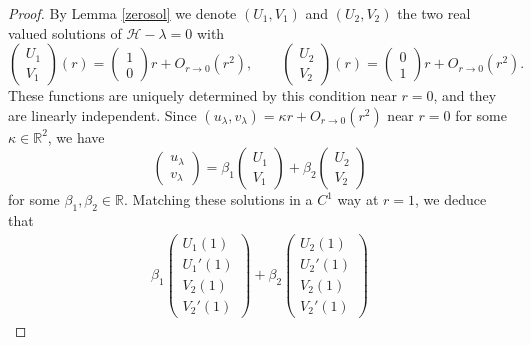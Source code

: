 \documentclass[11 pt]{amsart}
\theoremstyle{definition}
\theoremstyle{remark}
\numberwithin{equation}{section}
\begin{document}
\begin{proof}
By Lemma \ref{zerosol} we denote $(U_1, V_1)$ and $(U_2, V_2)$ the
  two real valued solutions of $\mathcal{H}- \lambda = 0$ with
  \[ \left(\begin{array}{c}
       U_1\\
       V_1
     \end{array}\right) (r) = \left(\begin{array}{c}
       1\\
       0
     \end{array}\right) r + O_{r \rightarrow 0} (r^2), \qquad \left(\begin{array}{c}
       U_2\\
       V_2
     \end{array}\right) (r) = \left(\begin{array}{c}
       0\\
       1
     \end{array}\right) r + O_{r \rightarrow 0} (r^2) . \]
  These functions are uniquely determined by this condition near $r = 0$, and
  they are linearly independent. Since $(u_{\lambda}, v_{\lambda}) = \kappa r
  + O_{r \rightarrow 0} (r^2)$ near $r = 0$ for some $\kappa \in
  \mathbb{R}^2$, we have
  \[ \left(\begin{array}{c}
       u_{\lambda}\\
       v_{\lambda}
     \end{array}\right) = \beta_1 \left(\begin{array}{c}
       U_1\\
       V_1
     \end{array}\right) + \beta_2 \left(\begin{array}{c}
       U_2\\
       V_2
     \end{array}\right) \]
  for some $\beta_1, \beta_2 \in \mathbb{R}$. Matching these solutions in a
  $C^1$ way at $r = 1$, we deduce that
  \begin{eqnarray*}
\beta_1 \left(\begin{array}{c}
      U_1 (1)\\
      U_1' (1)\\
      V_2 (1)\\
      V_2' (1)
    \end{array}\right) + \beta_2 \left(\begin{array}{c}
      U_2 (1)\\
      U_2' (1)\\
      V_2 (1)\\
      V_2' (1)
    \end{array}\right) 

\end{eqnarray*}
\end{proof}
\end{document}
